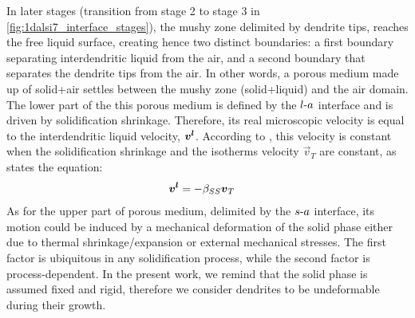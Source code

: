 In later stages (transition from stage 2 to stage 3 in \cref{fig:1dalsi7_interface_stages}), the mushy zone delimited by dendrite tips, 
reaches the free liquid surface, creating hence two distinct boundaries: 
a first boundary separating interdendritic liquid from the air, and a second boundary that separates the dendrite tips from the air.
In other words, a porous medium made up of solid+air settles between the mushy zone (solid+liquid) and the air domain. The lower part of the this porous medium is defined by the $l\text{-}a$ interface and is driven by solidification shrinkage.
Therefore, its real microscopic velocity is equal to the interdendritic liquid velocity, $\boldsymbol{v^l}$. 
According to \citet{dantzig_solidification_2009},
this velocity is constant when the solidification shrinkage and the isotherms velocity $\vec{v}_T$ are constant, as states the equation:
\begin{align}
\label{eq:real_velocity}
& \boldsymbol{v^l} = -\beta_{SS} \boldsymbol{v}_T
\end{align}
As for the upper part of porous medium, delimited by the $s\text{-}a$ interface, its motion could be induced by a mechanical deformation of the solid phase either due to thermal shrinkage/expansion or external mechanical stresses.
The first factor is ubiquitous in any solidification process, while the second factor is process-dependent. 
In the present work, we remind that the solid phase is assumed fixed and rigid, therefore we consider dendrites
to be undeformable during their growth. 

